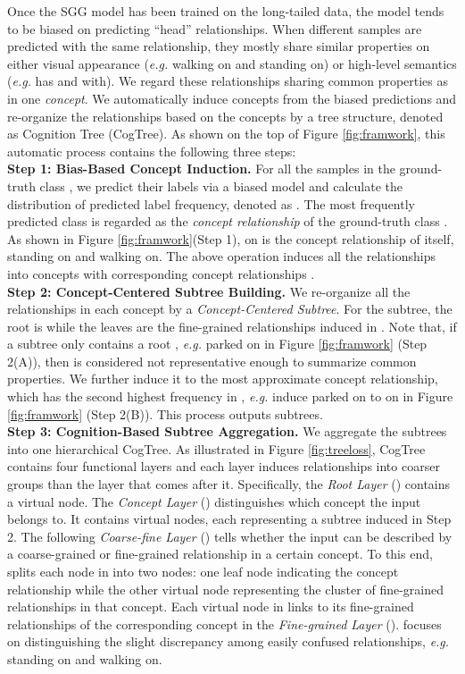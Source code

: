 \documentclass{article}
\begin{document}
Once the SGG model has been trained on the long-tailed data, the model tends to be biased on predicting ``head'' relationships. When different samples are predicted with the same relationship, they mostly share similar properties on either visual appearance (\textit{e.g.} {\ttfamily walking on} and {\ttfamily standing on}) or high-level semantics (\textit{e.g.} {\ttfamily has} and {\ttfamily with}).
We regard these relationships sharing common properties as in one \textit{concept}.  
We automatically induce concepts from the biased predictions and re-organize the relationships based on the concepts by a tree structure, denoted as Cognition Tree (CogTree). As shown on the top of Figure \ref{fig:framwork}, this automatic process contains the following three steps: \\
\textbf{Step 1: Bias-Based Concept Induction.} For all the samples in the ground-truth class , we predict their labels via a biased model and calculate the distribution of predicted label frequency, denoted as . The most frequently predicted class  is regarded as the \textit{concept relationship} of the ground-truth class . As shown in Figure \ref{fig:framwork}(Step 1), {\ttfamily on} is the concept relationship of itself, {\ttfamily standing on} and {\ttfamily walking on}. The above operation induces all the relationships into  concepts with corresponding concept relationships  .  
\\
\textbf{Step 2: Concept-Centered Subtree Building.} We re-organize all the relationships in each concept by a \textit{Concept-Centered Subtree}. For the  subtree, the root is  while the leaves are the fine-grained relationships induced in . Note that, if a subtree only contains a root , \textit{e.g.} {\ttfamily parked on} in Figure \ref{fig:framwork} (Step 2(A)), then  is considered not  representative enough to summarize common properties. We further induce it to the most approximate concept relationship, which has  the second highest frequency in , \textit{e.g.} induce {\ttfamily parked on} to {\ttfamily on} in Figure \ref{fig:framwork} (Step 2(B)). This process outputs  subtrees. \\
\textbf{Step 3: Cognition-Based Subtree Aggregation.} We aggregate the  subtrees into one hierarchical CogTree. As illustrated in Figure \ref{fig:treeloss}, CogTree contains four functional layers and each layer induces relationships into coarser groups than the layer that comes after it. Specifically, the \textit{Root Layer} () contains a virtual node. The  \textit{Concept Layer} () distinguishes which concept the input belongs to. It contains  virtual nodes, each representing a subtree induced in Step 2. The following \textit{Coarse-fine Layer} () tells whether the input can be described by a coarse-grained or fine-grained relationship in a certain concept.  To this end,  splits each node in  into two nodes: one leaf node indicating the concept relationship while the other virtual node representing the cluster of fine-grained relationships in that concept. Each virtual node in  links to its fine-grained relationships of the corresponding concept in the \textit{Fine-grained Layer} ().  focuses on distinguishing the slight discrepancy among easily confused relationships, \textit{e.g.} {\ttfamily standing on} and {\ttfamily walking on}.
\end{document}
